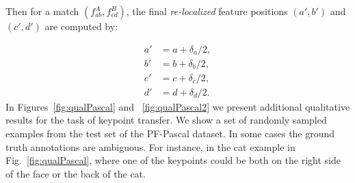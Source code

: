 \documentclass{article}
\begin{document}
Then for a match $(f^A_{ab},f^B_{cd})$, the final \emph{re-localized} feature positions $(a',b')$ and $(c',d')$ are computed by:

\begin{equation}
\begin{split}
a'&=a+\delta_a/2,\\ 
b'&=b+\delta_b/2,\\
c'&=c+\delta_c/2,\\
d'&=d+\delta_d/2.    
\end{split}
\end{equation}%
In Figures~\ref{fig:qualPascal} and ~\ref{fig:qualPascal2} we present additional qualitative results for the task of keypoint transfer. We show a set of randomly sampled examples from the test set of the PF-Pascal dataset. In some cases the ground truth annotations are ambiguous. For instance, in the cat example in Fig.~\ref{fig:qualPascal}, where one of the keypoints could be both on the right side of the face or the back of the cat.
\end{document}
